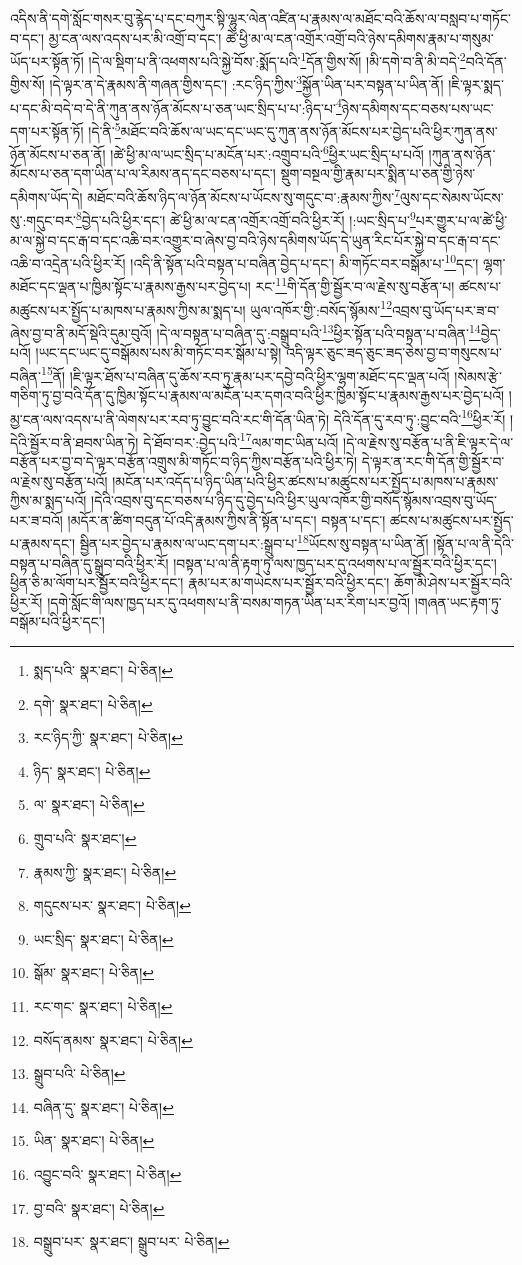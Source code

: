 འདིས་ནི་དགེ་སློང་གསར་བུ་རྙེད་པ་དང་བཀུར་སྟི་ལྷུར་ལེན་འཛིན་པ་རྣམས་ལ་མཐོང་བའི་ཆོས་ལ་བསླབ་པ་གཏོང་བ་དང་། མྱ་ངན་ལས་འདས་པར་མི་འགྲོ་བ་དང་། ཚེ་ཕྱི་མ་ལ་ངན་འགྲོར་འགྲོ་བའི་ཉེས་དམིགས་རྣམ་པ་གསུམ་ཡོད་པར་སྟོན་ཏོ། །དེ་ལ་སྡིག་པ་ནི་འཕགས་པའི་སྐྱེ་བོས་:སྨོད་པའི་\footnote{སྨད་པའི་  སྣར་ཐང་།  པེ་ཅིན། }དོན་གྱིས་སོ། །མི་དགེ་བ་ནི་མི་བདེ་\footnote{དགེ་  སྣར་ཐང་།  པེ་ཅིན། }བའི་དོན་གྱིས་སོ། །དེ་ལྟར་ན་དེ་རྣམས་ནི་གཞན་གྱིས་དང་། :རང་ཉིད་ཀྱིས་\footnote{རང་ཉིད་ཀྱི་  སྣར་ཐང་།  པེ་ཅིན། }སྐྱོན་ཡིན་པར་བསྟན་པ་ཡིན་ནོ། །ཇི་ལྟར་སྨད་པ་དང་མི་བདེ་བ་དེ་ནི་ཀུན་ནས་ཉོན་མོངས་པ་ཅན་ཡང་སྲིད་པ་པ་:ཉིད་པ་\footnote{ཉིད་  སྣར་ཐང་།  པེ་ཅིན། }ཉེས་དམིགས་དང་བཅས་པས་ཡང་དག་པར་སྟོན་ཏོ། །དེ་ནི་\footnote{ལ་  སྣར་ཐང་།  པེ་ཅིན། }མཐོང་བའི་ཆོས་ལ་ཡང་དང་ཡང་དུ་ཀུན་ནས་ཉོན་མོངས་པར་བྱེད་པའི་ཕྱིར་ཀུན་ནས་ཉོན་མོངས་པ་ཅན་ནོ། །ཚེ་ཕྱི་མ་ལ་ཡང་སྲིད་པ་མངོན་པར་:འགྲུབ་པའི་\footnote{གྲུབ་པའི་  སྣར་ཐང་། }ཕྱིར་ཡང་སྲིད་པ་པའོ། །ཀུན་ནས་ཉོན་མོངས་པ་ཅན་དག་ཡིན་པ་ལ་རིམས་ནད་དང་བཅས་པ་དང་། སྡུག་བསྔལ་གྱི་རྣམ་པར་སྨིན་པ་ཅན་གྱི་ཉེས་དམིགས་ཡོད་དེ། མཐོང་བའི་ཆོས་ཉིད་ལ་ཉོན་མོངས་པ་ཡོངས་སུ་གདུང་བ་:རྣམས་ཀྱིས་\footnote{རྣམས་ཀྱི་  སྣར་ཐང་།  པེ་ཅིན། }ལུས་དང་སེམས་ཡོངས་སུ་:གདུང་བར་\footnote{གདུངས་པར་  སྣར་ཐང་།  པེ་ཅིན། }བྱེད་པའི་ཕྱིར་དང་། ཚེ་ཕྱི་མ་ལ་ངན་འགྲོར་འགྲོ་བའི་ཕྱིར་རོ། །:ཡང་སྲིད་པ་\footnote{ཡང་སྲིད་  སྣར་ཐང་།  པེ་ཅིན། }པར་གྱུར་པ་ལ་ཚེ་ཕྱི་མ་ལ་སྐྱེ་བ་དང་རྒ་བ་དང་འཆི་བར་འགྱུར་བ་ཞེས་བྱ་བའི་ཉེས་དམིགས་ཡོད་དེ་ཡུན་རིང་པོར་སྐྱེ་བ་དང་རྒ་བ་དང་འཆི་བ་འདྲེན་པའི་ཕྱིར་རོ། །འདི་ནི་སྟོན་པའི་བསྟན་པ་བཞིན་བྱེད་པ་དང་། མི་གཏོང་བར་བསྒོམ་པ་\footnote{སྒོམ་  སྣར་ཐང་།  པེ་ཅིན། }དང་། ལྷག་མཐོང་དང་ལྡན་པ་ཁྱིམ་སྟོང་པ་རྣམས་རྒྱས་པར་བྱེད་པ། རང་\footnote{རང་གང་  སྣར་ཐང་།  པེ་ཅིན། }གི་དོན་གྱི་སྦྱོར་བ་ལ་རྗེས་སུ་བརྩོན་པ། ཚངས་པ་མཚུངས་པར་སྤྱོད་པ་མཁས་པ་རྣམས་ཀྱིས་མ་སྨད་པ། ཡུལ་འཁོར་གྱི་:བསོད་སྙོམས་\footnote{བསོད་ནམས་  སྣར་ཐང་།  པེ་ཅིན། }འབྲས་བུ་ཡོད་པར་ཟ་བ་ཞེས་བྱ་བ་ནི་མདོ་སྡེའི་དུམ་བུའོ། །དེ་ལ་བསྟན་པ་བཞིན་དུ་:བསྒྲུབ་པའི་\footnote{སྒྲུབ་པའི་  པེ་ཅིན། }ཕྱིར་སྟོན་པའི་བསྟན་པ་བཞིན་\footnote{བཞིན་དུ་  སྣར་ཐང་།  པེ་ཅིན། }བྱེད་པའོ། །ཡང་དང་ཡང་དུ་བསྒོམས་པས་མི་གཏོང་བར་སྒོམ་པ་སྟེ། འདི་ལྟར་ཅུང་ཟད་ཅུང་ཟད་ཅེས་བྱ་བ་གསུངས་པ་བཞིན་\footnote{ཡིན་  སྣར་ཐང་།  པེ་ཅིན། }ནོ། །ཇི་ལྟར་ཐོས་པ་བཞིན་དུ་ཆོས་རབ་ཏུ་རྣམ་པར་དབྱེ་བའི་ཕྱིར་ལྷག་མཐོང་དང་ལྡན་པའོ། །སེམས་རྩེ་གཅིག་ཏུ་བྱ་བའི་དོན་དུ་ཁྱིམ་སྟོང་པ་རྣམས་ལ་མངོན་པར་དགའ་བའི་ཕྱིར་ཁྱིམ་སྟོང་པ་རྣམས་རྒྱས་པར་བྱེད་པའོ། །མྱ་ངན་ལས་འདས་པ་ནི་ལེགས་པར་རབ་ཏུ་བྱུང་བའི་རང་གི་དོན་ཡིན་ཏེ། དེའི་དོན་དུ་རབ་ཏུ་:བྱུང་བའི་\footnote{འབྱུང་བའི་  སྣར་ཐང་།  པེ་ཅིན། }ཕྱིར་རོ། །དེའི་སྦྱོར་བ་ནི་ཐབས་ཡིན་ཏེ། དེ་ཐོབ་བར་:བྱེད་པའི་\footnote{བྱ་བའི་  སྣར་ཐང་།  པེ་ཅིན། }ལམ་གང་ཡིན་པའོ། །དེ་ལ་རྗེས་སུ་བརྩོན་པ་ནི་ཇི་ལྟར་དེ་ལ་བརྩོན་པར་བྱ་བ་དེ་ལྟར་བརྩོན་འགྲུས་མི་གཏོང་བ་ཉིད་ཀྱིས་བརྩོན་པའི་ཕྱིར་ཏེ། དེ་ལྟར་ན་རང་གི་དོན་གྱི་སྦྱོར་བ་ལ་རྗེས་སུ་བརྩོན་པའོ། །མངོན་པར་འདོད་པ་ཉིད་ཡིན་པའི་ཕྱིར་ཚངས་པ་མཚུངས་པར་སྤྱོད་པ་མཁས་པ་རྣམས་ཀྱིས་མ་སྨད་པའོ། །དེའི་འབྲས་བུ་དང་བཅས་པ་ཉིད་དུ་བྱེད་པའི་ཕྱིར་ཡུལ་འཁོར་གྱི་བསོད་སྙོམས་འབྲས་བུ་ཡོད་པར་ཟ་བའོ། །མདོར་ན་ཚིག་བདུན་པོ་འདི་རྣམས་ཀྱིས་ནི་སྟོན་པ་དང་། བསྟན་པ་དང་། ཚངས་པ་མཚུངས་པར་སྤྱོད་པ་རྣམས་དང་། སྦྱིན་པར་བྱེད་པ་རྣམས་ལ་ཡང་དག་པར་:སྒྲུབ་པ་\footnote{བསྒྲུབ་པར་  སྣར་ཐང་། སྒྲུབ་པར་  པེ་ཅིན། }ཡོངས་སུ་བསྟན་པ་ཡིན་ནོ། །སྟོན་པ་ལ་ནི་དེའི་བསྟན་པ་བཞིན་དུ་སྒྲུབ་བའི་ཕྱིར་རོ། །བསྟན་པ་ལ་ནི་རྟག་ཏུ་ལས་ཁྱད་པར་དུ་འཕགས་པ་ལ་སྦྱོར་བའི་ཕྱིར་དང་། ཕྱིན་ཅི་མ་ལོག་པར་སྦྱོར་བའི་ཕྱིར་དང་། རྣམ་པར་མ་གཡེངས་པར་སྦྱོར་བའི་ཕྱིར་དང་། ཆོག་མི་ཤེས་པར་སྦྱོར་བའི་ཕྱིར་རོ། །དགེ་སློང་གི་ལས་ཁྱད་པར་དུ་འཕགས་པ་ནི་བསམ་གཏན་ཡིན་པར་རིག་པར་བྱའོ། །གཞན་ཡང་རྟག་ཏུ་བསྒོམ་པའི་ཕྱིར་དང་། 